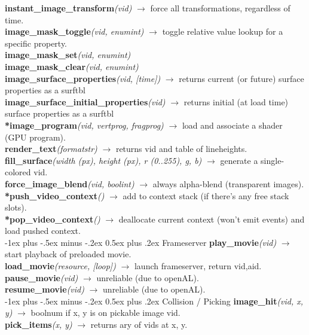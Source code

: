 \documentclass[10pt,landscape]{article}
\makeatletter
\renewcommand{\section}{\@startsection{section}{1}{0mm}%
                                {-1ex plus -.5ex minus -.2ex}%
                                {0.5ex plus .2ex}%
                                {\normalfont\large\bfseries}}
\makeatother
\begin{document}
\begin{multicols}{3}
	\textbf{instant\_image\_transform}\emph{(vid)} $\rightarrow$ force all transformations, regardless of time.\\
	\textbf{image\_mask\_toggle}\emph{(vid, enumint)} $\rightarrow$ toggle relative value lookup for a specific property.\\
	\textbf{image\_mask\_set}\emph{(vid, enumint)}\\
	\textbf{image\_mask\_clear}\emph{(vid, enumint)}\\
	\textbf{image\_surface\_properties}\emph{(vid, [time])} $\rightarrow$ returns current (or future) surface properties as a surftbl\\
	\textbf{image\_surface\_initial\_properties}\emph{(vid)} $\rightarrow$ returns initial (at load time) surface properties as a surftbl\\
	\textbf{*image\_program}\emph{(vid, vertprog, fragprog)} $\rightarrow$ load and associate a shader (GPU program).\\
	\textbf{render\_text}\emph{(formatstr)} $\rightarrow$ returns vid and table of lineheights.\\
	\textbf{fill\_surface}\emph{(width (px), height (px), r (0..255), g, b)} $\rightarrow$ generate a single-colored vid.\\
	\textbf{force\_image\_blend}\emph{(vid, boolint)} $\rightarrow$ always alpha-blend (transparent images).\\
	\textbf{*push\_video\_context}\emph{()} $\rightarrow$ add to context stack (if there's any free stack slots).\\
	\textbf{*pop\_video\_context}\emph{()} $\rightarrow$ deallocate current context (won't emit events) and load pushed context.\\

\section{Frameserver}
	\textbf{play\_movie}\emph{(vid)} $\rightarrow$ start playback of preloaded movie.\\
	\textbf{load\_movie}\emph{(resource, [loop])} $\rightarrow$ launch frameserver, return vid,aid. \\
	\textbf{pause\_movie}\emph{(vid)} $\rightarrow$ unreliable (due to openAL). \\
	\textbf{resume\_movie}\emph{(vid)} $\rightarrow$ unreliable (due to openAL). \\
	
\section{Collision / Picking}
	\textbf{image\_hit}\emph{(vid, x, y)} $\rightarrow$ boolnum if x, y is on pickable image vid.\\
	\textbf{pick\_items}\emph{(x, y)} $\rightarrow$ returns ary of vids at x, y.\\


\end{multicols}
\end{document}
